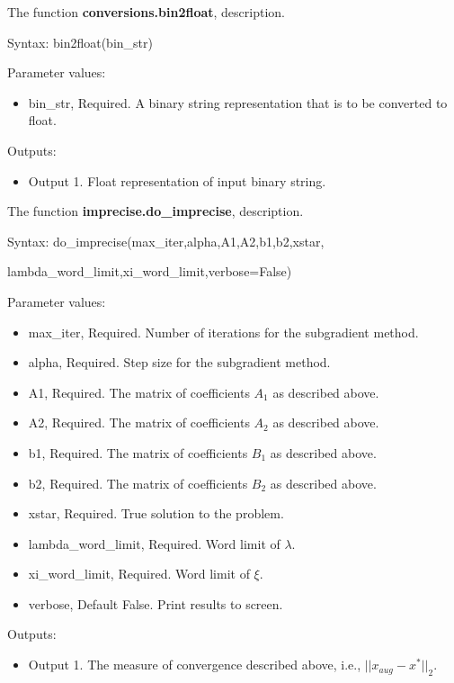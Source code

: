 \documentclass[12pt]{article}
\begin{document}
\noindent The function \textbf{conversions.bin2float}, description.

Syntax: bin2float(bin\_str)

Parameter values:
\begin{itemize}
	\item bin\_str, Required. A binary string representation that is to be converted to float.
\end{itemize}

Outputs:
\begin{itemize}
	\item Output 1. Float representation of input binary string. 
\end{itemize}

\noindent The function \textbf{imprecise.do\_imprecise}, description.

Syntax: do\_imprecise(max\_iter,alpha,A1,A2,b1,b2,xstar,

\qquad\qquad\qquad\qquad lambda\_word\_limit,xi\_word\_limit,verbose=False)

Parameter values:
\begin{itemize}
	\item max\_iter, Required. Number of iterations for the subgradient method.
	\item alpha, Required. Step size for the subgradient method.
	\item A1, Required. The matrix of coefficients $A_1$ as described above.
	\item A2, Required. The matrix of coefficients $A_2$ as described above.
	\item b1, Required. The matrix of coefficients $B_1$ as described above.
	\item b2, Required. The matrix of coefficients $B_2$ as described above.
	\item xstar, Required. True solution to the problem.
	\item lambda\_word\_limit, Required. Word limit of $\lambda$.
	\item xi\_word\_limit, Required. Word limit of $\xi$.
	\item verbose, Default False. Print results to screen.
\end{itemize}

Outputs:
\begin{itemize}
	\item Output 1. The measure of convergence described above, i.e., $||x_{aug}-x^*||_2$.
\end{itemize}
\end{document}
